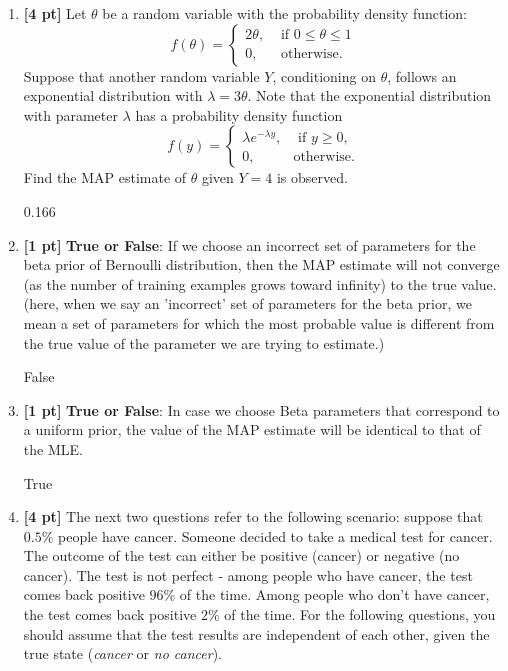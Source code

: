 \documentclass{article}
\begin{document}
\begin{enumerate}
    \item \textbf{[4 pt]} Let $\theta$ be a random variable with the probability density function:
    \[
    f(\theta) = 
    \begin{cases}
    2\theta, &\text{ if } 0 \leq \theta \leq 1 \\
    0, &\text{ otherwise}.
    \end{cases}
    \]
    Suppose that another random variable $Y$, conditioning on $\theta$, follows an exponential distribution with $\lambda=3\theta$. Note that the exponential distribution with parameter $\lambda$ has a probability density function
    \[
    f(y) = 
    \begin{cases}
    \lambda e^{-\lambda y}, &\text{ if } y \geq 0, \\
    0, &\text{otherwise}.
    \end{cases}
    \]
    Find the MAP estimate of $\theta$ given $Y=4$ is observed.
    \begin{tcolorbox}[width=\linewidth/3,height=1.5cm]
    0.166
    \end{tcolorbox}
    
    \item \textbf{[1 pt]} \textbf{True or False}: If we choose an incorrect set of parameters for the beta prior of Bernoulli distribution, then the MAP estimate will not converge (as the number of training examples grows toward infinity) to the true value.  (here, when we say an 'incorrect' set of parameters for the beta prior, we mean a set of parameters for which the most probable value is different from the true value of the parameter we are trying to estimate.)
    \begin{tcolorbox}[width=\linewidth/3,height=1.5cm]
    False
    \end{tcolorbox}
    \item \textbf{[1 pt]} \textbf{True or False}: In case we choose Beta parameters that correspond to a uniform prior, the value of the MAP estimate will be identical to that of the MLE.
    \begin{tcolorbox}[width=\linewidth/3,height=1.5cm]
    True
    \end{tcolorbox}
    \item \textbf{[4 pt]} The next two questions refer to the following scenario: suppose that $0.5\%$ people have cancer. Someone decided to take a medical test for cancer. The outcome of the test can either be positive (cancer) or negative (no cancer). The test is not perfect - among people who have cancer, the test comes back positive $96\%$ of the time. Among people who don't have cancer, the test comes back positive $2\%$ of the time. For the following questions, you should assume that the test results are independent of each other, given the true state (\textit{cancer} or \textit{no cancer}).
    

\end{enumerate}
\end{document}
